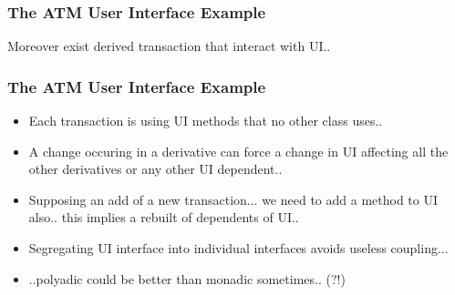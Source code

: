 \documentclass{beamer}
\begin{document}
\begin{frame}
  \frametitle{The ATM User Interface Example}
  Moreover exist derived transaction that interact with UI.. \\
  \begin{center}
  \end{center}
\end{frame}


\begin{frame}
  \frametitle{The ATM User Interface Example}
  \begin{itemize}
	\item<+-> Each transaction is using UI methods that no other class uses..
	\item<+-> A change occuring in a derivative can force a change in UI affecting all the other derivatives or any other UI dependent..
	\item<+-> Supposing an add of a new transaction... we need to add a method to UI also.. this implies a rebuilt of dependents of UI..
	\item<+-> Segregating UI interface into individual interfaces avoids useless coupling...
	\item<+-> ..polyadic could be better than monadic sometimes.. (?!)
   \end{itemize}
\end{frame}
\end{document}
